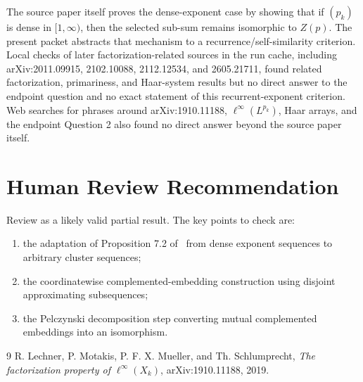 \documentclass[11pt]{article}
\begin{document}
The source paper itself proves the dense-exponent case by showing that if \((p_k)\) is dense in
\([1,\infty)\), then the selected sub-sum remains isomorphic to \(Z(p)\).  The present packet
abstracts that mechanism to a recurrence/self-similarity criterion.  Local checks of later
factorization-related sources in the run cache, including arXiv:2011.09915, 2102.10088, 2112.12534,
and 2605.21711, found related factorization, primariness, and Haar-system results but no direct
answer to the endpoint question and no exact statement of this recurrent-exponent criterion.
Web searches for phrases around arXiv:1910.11188, \(\ell^\infty(L^{p_k})\), Haar arrays, and the
endpoint Question 2 also found no direct answer beyond the source paper itself.

\section*{Human Review Recommendation}

Review as a likely valid partial result.  The key points to check are:
\begin{enumerate}
\item the adaptation of Proposition 7.2 of~\cite{LMMMS} from dense exponent sequences to arbitrary
cluster sequences;
\item the coordinatewise complemented-embedding construction using disjoint approximating
subsequences;
\item the Pelczynski decomposition step converting mutual complemented embeddings into an
isomorphism.
\end{enumerate}

\begin{thebibliography}{9}
R. Lechner, P. Motakis, P. F. X. Mueller, and Th. Schlumprecht,
\emph{The factorization property of \(\ell^\infty(X_k)\)}, arXiv:1910.11188, 2019.
\end{thebibliography}
\end{document}
